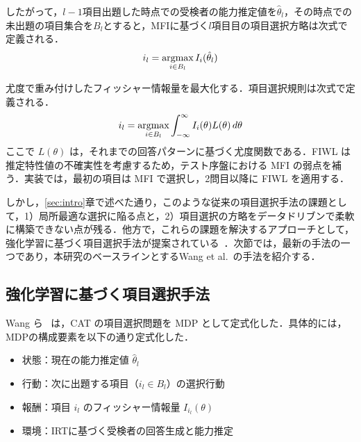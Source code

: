 \documentclass[dvipdfmx,a4j]{jarticle}
\newcommand{\argmax}{\mathop{\rm argmax}\limits}
\begin{document}
したがって，$l-1$項目出題した時点での受検者の能力推定値を$\hat{\theta}_l$，その時点での未出題の項目集合を$B_l$とすると，MFIに基づく$l$項目目の項目選択方略は次式で定義される．
\begin{equation}
i_l = \argmax_{i \in B_l} I_i(\hat{\theta}_l)
\end{equation}

{\color{red}
尤度で重み付けしたフィッシャー情報量を最大化する．項目選択規則は次式で定義される．
\begin{equation}
i_l = \argmax_{i \in B_l} \int_{-\infty}^{\infty} I_i(\theta) L(\theta)\, d\theta
\end{equation}
ここで $L(\theta)$ は，それまでの回答パターンに基づく尤度関数である．FIWL は推定特性値の不確実性を考慮するため，テスト序盤における MFI の弱点を補う．実装では，最初の項目は MFI で選択し，2問目以降に FIWL を適用する．
}

しかし，\ref{sec:intro}章で述べた通り，このような従来の項目選択手法の課題として，1）局所最適な選択に陥る点と，2）項目選択の方略をデータドリブンで柔軟に構築できない点が残る．他方で，これらの課題を解決するアプローチとして，強化学習に基づく項目選択手法が提案されている~\cite{ghosh2021,nurakhmetov2019,shin2022,wang2024}．次節では，最新の手法の一つであり，本研究のベースラインとするWang et al.~\cite{wang2024}の手法を紹介する．


\subsection{強化学習に基づく項目選択手法}

Wang ら~\cite{wang2024} は，CAT の項目選択問題を MDP として定式化した．具体的には，MDPの構成要素を以下の通り定式化した．
\begin{itemize}
\item 状態：現在の能力推定値 $\hat{\theta}_l$
\item 行動：次に出題する項目（$i_l \in B_l$）の選択行動
\item 報酬：項目 $i_l$ のフィッシャー情報量 $I_{i_l}(\theta)$
\item 環境：IRTに基づく受検者の回答生成と能力推定
\end{itemize}
\end{document}
